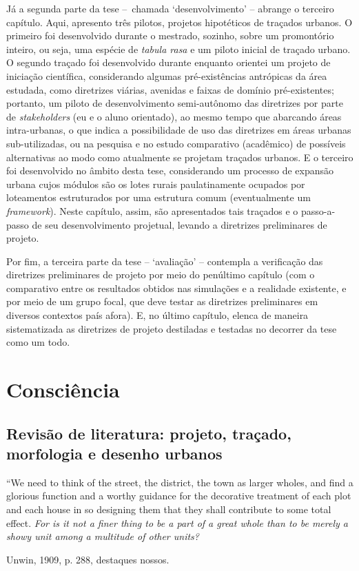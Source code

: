 \documentclass[12pt, a4paper]{book} %
\begin{document}
            Já a segunda parte da tese – chamada `desenvolvimento' – abrange o terceiro capítulo. Aqui, apresento três pilotos, projetos hipotéticos de traçados urbanos. O primeiro foi desenvolvido durante o mestrado, sozinho, sobre um promontório inteiro, ou seja, uma espécie de \textit{tabula rasa} e um piloto inicial de traçado urbano. O segundo traçado foi desenvolvido durante enquanto orientei um projeto de iniciação científica, considerando algumas pré-existências antrópicas da área estudada, como diretrizes viárias, avenidas e faixas de domínio pré-existentes; portanto, um piloto de desenvolvimento semi-autônomo das diretrizes por parte de \textit{stakeholders} (eu e o aluno orientado), ao mesmo tempo que abarcando áreas intra-urbanas, o que indica a possibilidade de uso das diretrizes em áreas urbanas sub-utilizadas, ou na pesquisa e no estudo comparativo (acadêmico) de possíveis alternativas ao modo como atualmente se projetam traçados urbanos. E o terceiro foi desenvolvido no âmbito desta tese, considerando um processo de expansão urbana cujos módulos são os lotes rurais paulatinamente ocupados por loteamentos estruturados por uma estrutura comum (eventualmente um \textit{framework}). Neste capítulo, assim, são apresentados tais traçados e o passo-a-passo de seu desenvolvimento projetual, levando a diretrizes preliminares de projeto.

            Por fim, a terceira parte da tese – `avaliação' – contempla a verificação das diretrizes preliminares de projeto por meio do penúltimo capítulo (com o comparativo entre os resultados obtidos nas simulações e a realidade existente, e por meio de um grupo focal, que deve testar as diretrizes preliminares em diversos contextos país afora). E, no último capítulo, elenca de maneira sistematizada as diretrizes de projeto destiladas e testadas no decorrer da tese como um todo.


    
    \part[Consciência]{Consciência}

        \chapter[Revisão de literatura: projeto, traçado, morfologia e desenho urbanos]{Revisão de literatura: projeto, traçado, morfologia e desenho urbanos}

        \epigraph{``We need to think of the street, the district, the town as larger wholes, and find a glorious function and a worthy guidance for the decorative treatment of each plot and each house in so designing them that they shall contribute to some total effect. \textit{For is it not a finer thing to be a part of a great whole than to be merely a showy unit among a multitude of other units?}}{Unwin, 1909, p. 288, destaques nossos.}
\end{document}

